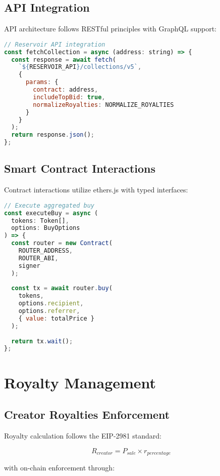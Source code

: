 \documentclass[11pt,a4paper]{article}
\begin{document}
\subsection{API Integration}

API architecture follows RESTful principles with GraphQL support:

\begin{lstlisting}[language=JavaScript]
// Reservoir API integration
const fetchCollection = async (address: string) => {
  const response = await fetch(
    `${RESERVOIR_API}/collections/v5`,
    {
      params: {
        contract: address,
        includeTopBid: true,
        normalizeRoyalties: NORMALIZE_ROYALTIES
      }
    }
  );
  return response.json();
};
\end{lstlisting}

\subsection{Smart Contract Interactions}

Contract interactions utilize ethers.js with typed interfaces:

\begin{lstlisting}[language=JavaScript]
// Execute aggregated buy
const executeBuy = async (
  tokens: Token[],
  options: BuyOptions
) => {
  const router = new Contract(
    ROUTER_ADDRESS,
    ROUTER_ABI,
    signer
  );
  
  const tx = await router.buy(
    tokens,
    options.recipient,
    options.referrer,
    { value: totalPrice }
  );
  
  return tx.wait();
};
\end{lstlisting}

\section{Royalty Management}

\subsection{Creator Royalties Enforcement}

Royalty calculation follows the EIP-2981 standard:

\begin{equation}
R_{creator} = P_{sale} \times r_{percentage}
\end{equation}

with on-chain enforcement through:
\end{document}
